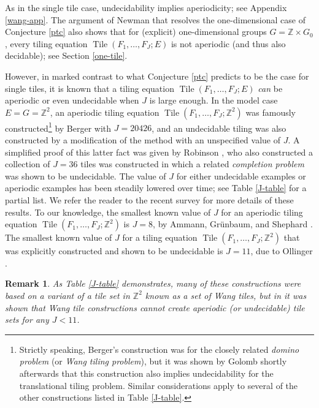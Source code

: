 \documentclass[reqno,a4paper,12pt]{amsart}
\numberwithin{equation}{section}
\numberwithin{figure}{section}
\def\Z{\mathbb{Z}}
\newcommand{\Tile}{\operatorname{Tile}}
\theoremstyle{plain}
\newtheorem{remark}[thm]{Remark}
\theoremstyle{definition}
\begin{document}
As in the single tile case, undecidability implies aperiodicity; see Appendix \ref{wang-app}. The argument of Newman that resolves the one-dimensional case of Conjecture \ref{ptc} also shows that for (explicit) one-dimensional groups $G = \Z \times G_0$, every tiling equation $\Tile(F_1,\dots,F_J;E)$ is not aperiodic (and thus also decidable); see Section \ref{one-tile}.

However, in marked contrast to what Conjecture \ref{ptc} predicts to be the case for single tiles, it is known that a tiling equation $\Tile(F_1,\dots,F_J;E)$ \emph{can} be aperiodic or even undecidable when $J$ is large enough.  In the model case $E=G=\Z^2$, an aperiodic tiling equation $\Tile(F_1,\dots,F_J;\Z^2)$ was famously constructed\footnote{Strictly speaking, Berger's construction was for the closely related \emph{domino problem} (or \emph{Wang tiling problem}), but it was shown by Golomb \cite{golomb} shortly afterwards that this construction also implies undecidability for the translational tiling problem.  Similar considerations apply to several of the other constructions listed in Table \ref{J-table}.} by Berger \cite{Ber} with $J = 20426$, and an undecidable tiling was also constructed by a modification of the method with an unspecified value of $J$.  A simplified proof of this latter fact was given by Robinson \cite{R}, who also constructed a collection of $J=36$ tiles was constructed in which a related \emph{completion problem} was shown to be undecidable.  The value of $J$ for either undecidable examples or aperiodic examples has been steadily lowered over time; see Table \ref{J-table} for a partial list.  We refer the reader to the recent survey \cite{jv} for more details of these results.  To our knowledge, the smallest known value of $J$ for an aperiodic tiling equation $\Tile(F_1,\dots,F_J;\Z^2)$ is $J=8$, by Ammann, Gr\"unbaum, and Shephard \cite{ags}. The smallest known value of $J$ for a tiling equation $\Tile(F_1,\dots,F_J;\Z^2)$ that was explicitly constructed and shown to be undecidable is $J=11$, due to Ollinger \cite{ollinger-2}.

\begin{remark}
As Table \ref{J-table} demonstrates, many of these constructions were based on a variant of a tile set in $\Z^2$ known as a set of \emph{Wang tiles}, but in \cite{jr} it was shown that Wang tile constructions cannot create aperiodic (or undecidable) tile sets for any $J < 11$.  
\end{remark}
\end{document}
